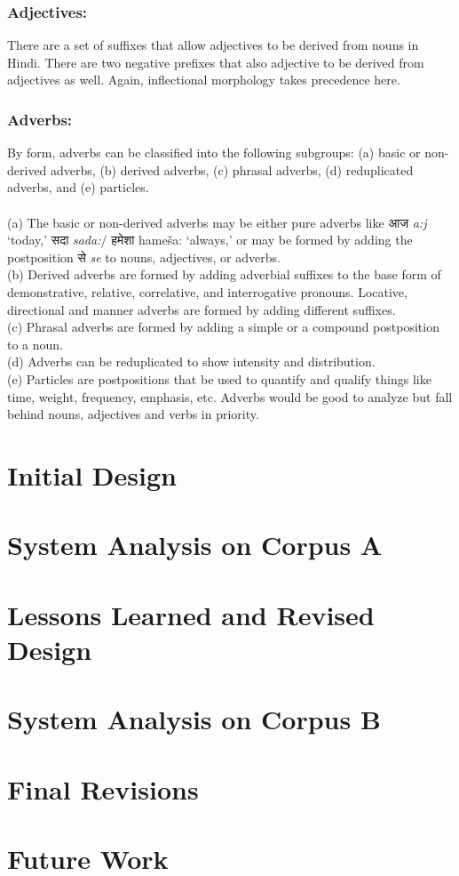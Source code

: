 \documentclass[11pt,letterpaper]{article}
\begin{document}
\subsubsection{Adjectives:}
There are a set of suffixes that allow adjectives to be derived from nouns in Hindi. There are two negative prefixes that also adjective to be derived from adjectives as well. Again, inflectional morphology takes precedence here.
\subsubsection{Adverbs:}
By form, adverbs can be classified into the following subgroups: (a)
basic or non-derived adverbs, (b) derived adverbs, (c) phrasal
adverbs, (d) reduplicated adverbs, and (e) particles.\\
\\
(a) The basic or non-derived adverbs may be either pure adverbs like
आज \textit{a:j} ‘today,’ सदा \textit{sada:}/ हमेशा hameša: ‘always,’ or may be formed
by adding the postposition से \textit{se} to nouns, adjectives, or adverbs.\\
(b) Derived adverbs are formed by adding adverbial suffixes to the
base form of demonstrative, relative, correlative, and interrogative
pronouns. Locative, directional and manner adverbs are formed by adding different suffixes.\\
(c) Phrasal adverbs are formed by adding a simple or a compound
postposition to a noun.\\
(d) Adverbs can be reduplicated to show intensity and distribution.\\
(e) Particles are postpositions that be used to quantify and qualify things like time, weight, frequency, emphasis, etc.
Adverbs would be good to analyze but fall behind nouns, adjectives and verbs in priority.
\section{Initial Design}

\section{System Analysis on Corpus A}

\section{Lessons Learned and Revised Design}

\section{System Analysis on Corpus B}

\section{Final Revisions}

\section{Future Work}







\label{lastpage}
\end{document}
